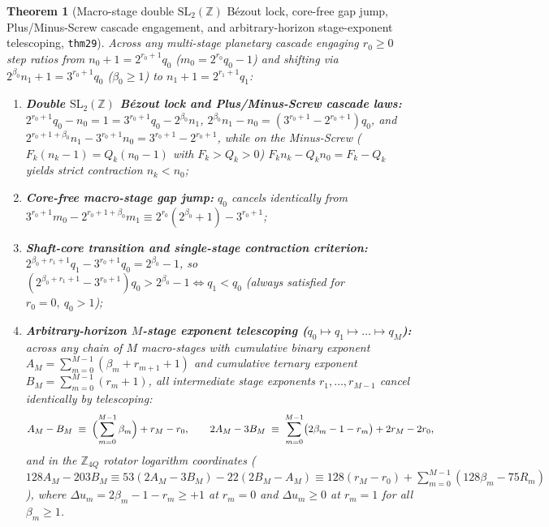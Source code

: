 \documentclass[11pt,a4paper]{article}
\newtheorem{theorem}{Theorem}[section]
\theoremstyle{definition}
\theoremstyle{remark}
\begin{document}
\begin{theorem}[Macro-stage double $\mathrm{SL}_2(\mathbb{Z})$ Bézout lock, core-free gap jump, Plus/Minus-Screw cascade engagement, and arbitrary-horizon stage-exponent telescoping, \texttt{thm29}]
\label{thm:odd-core-dynamics}
Across any multi-stage planetary cascade engaging $r_0 \ge 0$ step ratios from $n_0 + 1 = 2^{r_0 + 1} q_0$ ($m_0 = 2^{r_0} q_0 - 1$) and shifting via $2^{\beta_0} n_1 + 1 = 3^{r_0 + 1} q_0$ ($\beta_0 \ge 1$) to $n_1 + 1 = 2^{r_1 + 1} q_1$:
\begin{enumerate}[label=\textbf{(\roman*)},leftmargin=*,noitemsep]
\item \textbf{Double $\mathrm{SL}_2(\mathbb{Z})$ Bézout lock and Plus/Minus-Screw cascade laws:} $2^{r_0 + 1} q_0 - n_0 = 1 = 3^{r_0 + 1} q_0 - 2^{\beta_0} n_1$, $2^{\beta_0} n_1 - n_0 = (3^{r_0 + 1} - 2^{r_0 + 1}) q_0$, and $2^{r_0 + 1 + \beta_0} n_1 - 3^{r_0 + 1} n_0 = 3^{r_0 + 1} - 2^{r_0 + 1}$, while on the Minus-Screw ($F_k(n_k - 1) = Q_k(n_0 - 1)$ with $F_k > Q_k > 0$) $F_k n_k - Q_k n_0 = F_k - Q_k$ yields strict contraction $n_k < n_0$;
\item \textbf{Core-free macro-stage gap jump:} $q_0$ cancels identically from $3^{r_0 + 1} m_0 - 2^{r_0 + 1 + \beta_0} m_1 \equiv 2^{r_0}(2^{\beta_0} + 1) - 3^{r_0 + 1}$;
\item \textbf{Shaft-core transition and single-stage contraction criterion:} $2^{\beta_0 + r_1 + 1} q_1 - 3^{r_0 + 1} q_0 = 2^{\beta_0} - 1$, so $(2^{\beta_0 + r_1 + 1} - 3^{r_0 + 1}) q_0 > 2^{\beta_0} - 1 \iff q_1 < q_0$ (always satisfied for $r_0 = 0,\ q_0 > 1$);
\item \textbf{Arbitrary-horizon $M$-stage exponent telescoping ($q_0 \mapsto q_1 \mapsto \dots \mapsto q_M$):} across any chain of $M$ macro-stages with cumulative binary exponent $A_M = \sum_{m=0}^{M-1}(\beta_m + r_{m+1} + 1)$ and cumulative ternary exponent $B_M = \sum_{m=0}^{M-1}(r_m + 1)$, all intermediate stage exponents $r_1,\dots,r_{M-1}$ cancel identically by telescoping:
  \[
    A_M - B_M \;\equiv\; \Bigl(\sum_{m=0}^{M-1}\beta_m\Bigr) + r_M - r_0, \qquad
    2 A_M - 3 B_M \;\equiv\; \sum_{m=0}^{M-1}\bigl(2\beta_m - 1 - r_m\bigr) + 2 r_M - 2 r_0,
  \]
  and in the $\mathbb{Z}_{4Q}$ rotator logarithm coordinates ($128 A_M - 203 B_M \equiv 53(2 A_M - 3 B_M) - 22(2 B_M - A_M) \equiv 128(r_M - r_0) + \sum_{m=0}^{M-1}(128\beta_m - 75 R_m)$), where $\Delta u_m = 2\beta_m - 1 - r_m \ge +1$ at $r_m = 0$ and $\Delta u_m \ge 0$ at $r_m = 1$ for all $\beta_m \ge 1$.
\end{enumerate}
\end{theorem}
\end{document}
